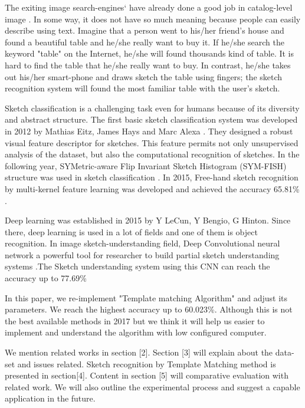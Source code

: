 \documentclass[10pt,twocolumn,letterpaper]{article}
\begin{document}
The exiting image search-engines` have already done a good job in catalog-level image \cite{SketchShoe}. In some way, it does not have so much meaning because people can easily describe using text. Imagine that a person went to his/her friend’s house and found a beautiful table and he/she really want to buy it. If he/she search the keyword {"table"} on the Internet, he/she will found thousands kind of table. It is hard to find the table that he/she really want to buy. In contrast, he/she takes out his/her smart-phone and draws sketch the table using fingers; the sketch recognition system will found the most familiar table with the user’s sketch. 

Sketch classification is a challenging task even for humans because of its diversity and abstract structure\cite{deepSketchSmartPhone}. The first basic sketch classification system was developed in 2012 by Mathias Eitz, James Hays and Marc Alexa \cite{howdohumans}. They designed a robust visual feature descriptor for sketches. This feature permits not only unsupervised analysis of the dataset, but also the computational recognition of sketches. In the following year, SYMetric-aware Flip Invariant Sketch Histogram (SYM-FISH) structure was used in sketch classification \cite{SYM-FISH}. In 2015, Free-hand sketch recognition by multi-kernel feature learning was developed and achieved the accuracy 65.81\% \cite{multiKernel}.

Deep learning was established in 2015 by Y LeCun, Y Bengio, G Hinton. Since there, deep learning is used in a lot of fields and one of them is object recognition. In image sketch-understanding field, Deep Convolutional neural network a powerful tool for researcher to build partial sketch understanding systems \cite{deepSketchSmartPhone,DeepSketch2}.The Sketch understanding system using this CNN can reach the accuracy up to 77.69\% \cite{DeepSketch2}  

In this paper, we re-implement "Template matching Algorithm" and adjust its parameters. We reach the highest accuracy up to 60.023\%. Although this is not the best available methods in 2017 but we think it will help us easier to implement and understand the algorithm with low configured computer.

We mention related works in section [2]. Section [3]
will explain about the data-set and issues related. Sketch recognition by Template Matching method is presented in section[4]. Content in section [5] will comparative evaluation with related work. We will also outline the experimental process and suggest a capable application
in the future.
{\small
	
	
}
\end{document}
